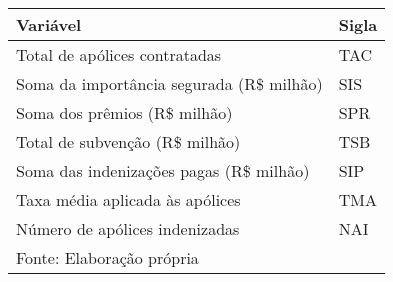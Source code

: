\begin{center}
\begin{tabular}{ll}
\hline 
Variável & Sigla  \tabularnewline
\hline 
Total de apólices contratadas                  & TAC       \\ %
Soma da importância segurada (R\$ milhão)      & SIS       \\ %
Soma dos prêmios (R\$ milhão)                  & SPR       \\ %
Total de subvenção (R\$ milhão)                & TSB       \\ %
Soma das indenizações pagas (R\$ milhão)       & SIP       \\ %
Taxa média aplicada às apólices                & TMA       \\ %
Número de apólices indenizadas                 & NAI       \\ %
\hline 
\vspace{0.1cm}
\footnotesize{Fonte: Elaboração própria}
\end{tabular}
\end{center}